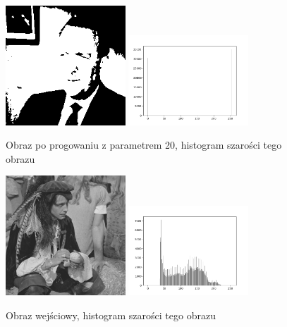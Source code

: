 \documentclass[final,a4paper,openany,12pt]{mwbk}
\begin{document}
\begin{figure}[H]
	\begin{center}
		\includegraphics[width=0.4\textwidth]{gentelman_gray_globThreshold_result}
		\includegraphics[width=0.4\textwidth]{gentelman_gray_globThreshold_histogram}
	\end{center}
	\caption{Obraz po progowaniu z parametrem 20, histogram szarości tego obrazu}
\end{figure}

\begin{figure}[H]
	\begin{center}
		\includegraphics[width=0.4\textwidth]{pirate_gray}
		\includegraphics[width=0.4\textwidth]{pirate_gray_histogram}
	\end{center}
	\caption{Obraz wejściowy, histogram szarości tego obrazu}
\end{figure}
\end{document}
